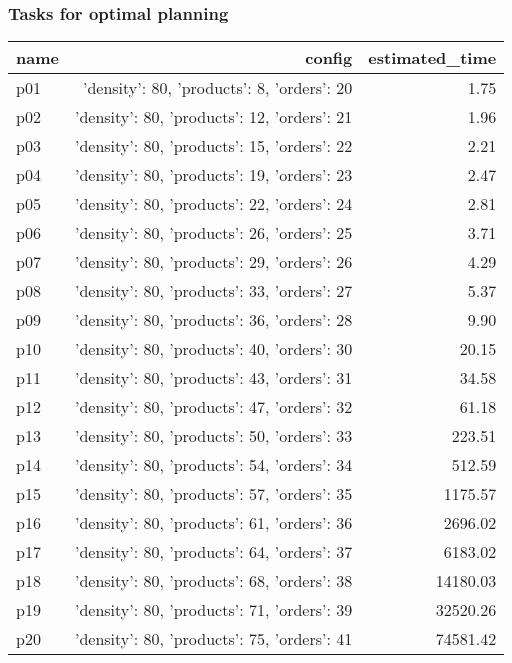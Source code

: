\documentclass{article}
\begin{document}
                                \subsubsection*{Tasks for optimal planning}
                                
                            \begin{center}
                            \scriptsize
                            \begin{tabular}{@{}l|r|r@{}}
                            name & config & estimated\_time\\\midrule
                              p01&{'density': 80, 'products': 8, 'orders': 20}&1.75\\
  p02&{'density': 80, 'products': 12, 'orders': 21}&1.96\\
  p03&{'density': 80, 'products': 15, 'orders': 22}&2.21\\
  p04&{'density': 80, 'products': 19, 'orders': 23}&2.47\\
  p05&{'density': 80, 'products': 22, 'orders': 24}&2.81\\
  p06&{'density': 80, 'products': 26, 'orders': 25}&3.71\\
  p07&{'density': 80, 'products': 29, 'orders': 26}&4.29\\
  p08&{'density': 80, 'products': 33, 'orders': 27}&5.37\\
  p09&{'density': 80, 'products': 36, 'orders': 28}&9.90\\
  p10&{'density': 80, 'products': 40, 'orders': 30}&20.15\\
  p11&{'density': 80, 'products': 43, 'orders': 31}&34.58\\
  p12&{'density': 80, 'products': 47, 'orders': 32}&61.18\\
  p13&{'density': 80, 'products': 50, 'orders': 33}&223.51\\
  p14&{'density': 80, 'products': 54, 'orders': 34}&512.59\\
  p15&{'density': 80, 'products': 57, 'orders': 35}&1175.57\\
  p16&{'density': 80, 'products': 61, 'orders': 36}&2696.02\\
  p17&{'density': 80, 'products': 64, 'orders': 37}&6183.02\\
  p18&{'density': 80, 'products': 68, 'orders': 38}&14180.03\\
  p19&{'density': 80, 'products': 71, 'orders': 39}&32520.26\\
  p20&{'density': 80, 'products': 75, 'orders': 41}&74581.42\\

\end{tabular}
\end{center}
\end{document}
